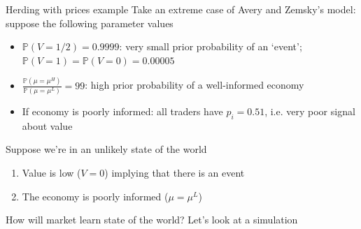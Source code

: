 \documentclass[english,10pt
,aspectratio=169
]{beamer}
\begin{document}
\begin{frame}{Herding with prices example} \label{layers}
	Take an extreme case of Avery and Zemsky's model: suppose the following parameter values
	\begin{itemize}
		\item $\mathbb{P}(V=1/2)=0.9999$: very small prior probability of an `event'; $\mathbb{P}(V=1)=\mathbb{P}(V=0)=0.00005$
		\item $\frac{\mathbb{P}(\mu=\mu^{H})}{\mathbb{P}(\mu=\mu^{L})}=99$: high prior probability of a well-informed economy
		\item If economy is poorly informed: all traders have $p_{i}=0.51$, i.e. very poor signal about value
	\end{itemize}
	Suppose we're in an unlikely state of the world
	\begin{enumerate}
		\item Value is low ($V=0$) implying that there is an event
		\item The economy is poorly informed ($\mu=\mu^L$)
	\end{enumerate}
	How will  market learn state of the world? Let's look at a  simulation
\end{frame}
\end{document}
